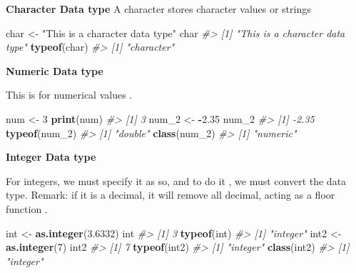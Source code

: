 \documentclass[
]{book}
\newenvironment{Shaded}{\begin{snugshade}}{\end{snugshade}}
\newcommand{\CommentTok}[1]{\textcolor[rgb]{0.56,0.35,0.01}{\textit{#1}}}
\newcommand{\DecValTok}[1]{\textcolor[rgb]{0.00,0.00,0.81}{#1}}
\newcommand{\FloatTok}[1]{\textcolor[rgb]{0.00,0.00,0.81}{#1}}
\newcommand{\FunctionTok}[1]{\textcolor[rgb]{0.13,0.29,0.53}{\textbf{#1}}}
\newcommand{\NormalTok}[1]{#1}
\newcommand{\OtherTok}[1]{\textcolor[rgb]{0.56,0.35,0.01}{#1}}
\newcommand{\SpecialCharTok}[1]{\textcolor[rgb]{0.81,0.36,0.00}{\textbf{#1}}}
\newcommand{\StringTok}[1]{\textcolor[rgb]{0.31,0.60,0.02}{#1}}
\begin{document}
\textbf{Character Data type }
A character stores character values or strings

\begin{Shaded}
\begin{Highlighting}[]
\NormalTok{char }\OtherTok{\textless{}{-}} \StringTok{"This is a character data type"}
\NormalTok{char}
\CommentTok{\#\textgreater{} [1] "This is a character data type"}
\FunctionTok{typeof}\NormalTok{(char)}
\CommentTok{\#\textgreater{} [1] "character"}
\end{Highlighting}
\end{Shaded}

\textbf{Numeric Data type }

This is for numerical values .

\begin{Shaded}
\begin{Highlighting}[]
\NormalTok{num }\OtherTok{\textless{}{-}} \DecValTok{3}
\FunctionTok{print}\NormalTok{(num)}
\CommentTok{\#\textgreater{} [1] 3}
\NormalTok{num\_2 }\OtherTok{\textless{}{-}} \SpecialCharTok{{-}}\FloatTok{2.35}
\NormalTok{num\_2}
\CommentTok{\#\textgreater{} [1] {-}2.35}
\FunctionTok{typeof}\NormalTok{(num\_2)}
\CommentTok{\#\textgreater{} [1] "double"}
\FunctionTok{class}\NormalTok{(num\_2)}
\CommentTok{\#\textgreater{} [1] "numeric"}
\end{Highlighting}
\end{Shaded}

\textbf{Integer Data type}

For integers, we must specify it as so, and to do it , we must convert the data type. Remark: if it is a decimal, it will remove all decimal, acting as a floor function .

\begin{Shaded}
\begin{Highlighting}[]
\NormalTok{int }\OtherTok{\textless{}{-}} \FunctionTok{as.integer}\NormalTok{(}\FloatTok{3.6332}\NormalTok{)}
\NormalTok{int}
\CommentTok{\#\textgreater{} [1] 3}
\FunctionTok{typeof}\NormalTok{(int)}
\CommentTok{\#\textgreater{} [1] "integer"}
\NormalTok{int2 }\OtherTok{\textless{}{-}} \FunctionTok{as.integer}\NormalTok{(}\DecValTok{7}\NormalTok{)}
\NormalTok{int2}
\CommentTok{\#\textgreater{} [1] 7}
\FunctionTok{typeof}\NormalTok{(int2)}
\CommentTok{\#\textgreater{} [1] "integer"}
\FunctionTok{class}\NormalTok{(int2)}
\CommentTok{\#\textgreater{} [1] "integer"}
\end{Highlighting}
\end{Shaded}
\end{document}

